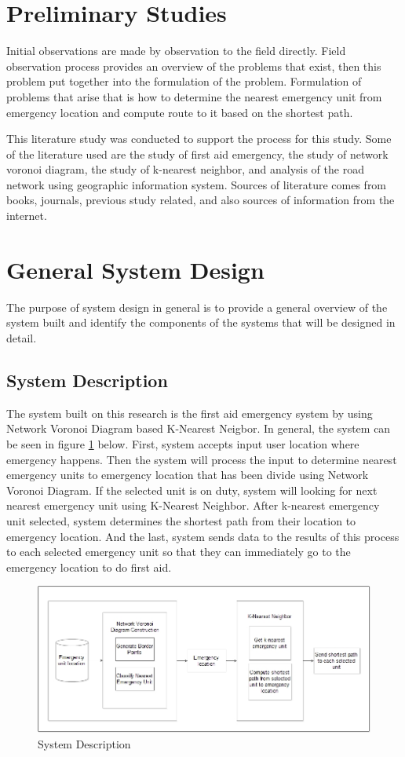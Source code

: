 \section{Preliminary Studies}
Initial observations are made by observation to the field directly. Field observation process provides an overview of the problems that exist, then this problem put together into the formulation of the problem. Formulation of problems that arise that is how to determine the nearest emergency unit from emergency location and compute route to it based on the shortest path.

This literature study was conducted to support the process for this study. Some of the literature used are the study of first aid emergency, the study of network voronoi diagram, the study of k-nearest neighbor, and analysis of the road network using geographic information system. Sources of literature comes from books, journals, previous study related, and also sources of information from the internet.
\pagebreak

\section{General System Design}
The purpose of system design in general is to provide a general overview of the system built and identify the components of the systems that will be designed in detail.

\subsection{System Description}
The system built on this research is the first aid emergency system by using Network Voronoi Diagram based K-Nearest Neigbor. In general, the system can be seen in figure \ref{fig:system_description} below. First, system accepts input user location where emergency happens. Then the system will process the input to determine nearest emergency units to emergency location that has been divide using Network Voronoi Diagram. If the selected unit is on duty, system will looking for next nearest emergency unit using K-Nearest Neighbor. After k-nearest emergency unit selected, system determines the shortest path from their location to emergency location. And the last, system sends data to the results of this process to each selected emergency unit so that they can immediately go to the emergency location to do first aid.

\begin{figure}[H]
    \centering
    \includegraphics[scale=0.6]{system-desc.jpg}
    \caption{System Description}
    \label{fig:system_description}
\end{figure}
\pagebreak

